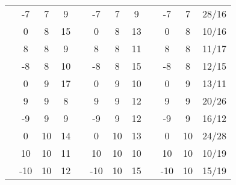 \begin{table}[H]
\begin{center}
{\begin{tabular}{c|c|c|c | c|c|c|c| c|c|c|c}
   &-7 &7  & 9  &&-7 &7  & 9&  &-7 &7  & 28/16  \\  \cline{2-4} \cline{6-8} \cline{10-12} 
   &0 &8  & 15  &&0 &8  & 13&  &0 &8  & 10/16 \\  \cline{2-4} \cline{6-8} \cline{10-12} 
  &8 &8 & 9 &&8 &8  & 11 &  &8 &8  & 11/17\\  \cline{2-4} \cline{6-8} \cline{10-12} 
   &-8 &8  & 10  &&-8 &8  & 15&  &-8 &8  & 12/15 \\  \cline{2-4} \cline{6-8} \cline{10-12} 
    &0 &9  & 17  &&0 &9  & 10 &  &0 &9  & 13/11\\  \cline{2-4} \cline{6-8} \cline{10-12} 
  &9 &9 & 8 &&9 &9  & 12 &  &9 &9  & 20/26\\  \cline{2-4} \cline{6-8} \cline{10-12} 
   &-9 &9  & 9  &&-9 &9  & 12  &  &-9 &9  & 16/12\\ \cline{2-4} \cline{6-8} \cline{10-12} 
   &0 &10  & 14  &&0 &10  & 13&  &0 &10  & 24/28\\  \cline{2-4} \cline{6-8} \cline{10-12} 
  &10 &10 & 11 &&10 &10  &10 &  &10 &10  & 10/19\\  \cline{2-4} \cline{6-8} \cline{10-12} 
   &-10 &10  & 12   &&-10 &10  & 15 &  &-10 &10  & 15/19 \\ \cline{2-4} \cline{6-8} \cline{10-12} 
 \hline\hline
\end{tabular}

}
\label{tabthreshold}
\end{center}
\end{table}

